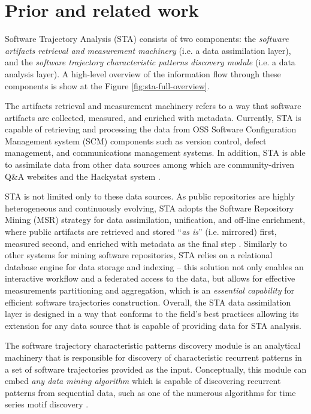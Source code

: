 \chapter{Prior and related work}\label{chapter_background_work}
Software Trajectory Analysis (STA) consists of two components: 
the \textit{software artifacts retrieval and measurement machinery} (i.e. a data assimilation layer), 
and the \textit{software trajectory characteristic patterns discovery module} (i.e. a data analysis layer). 
A high-level overview of the information flow through these components is show at the Figure \ref{fig:sta-full-overview}.

The artifacts retrieval and measurement machinery refers to a way that software artifacts are collected, 
measured, and enriched with metadata. 
Currently, STA is capable of retrieving and processing the data from OSS Software 
Configuration Management system (SCM) components such as version control, 
defect management, and communications management systems. 
In addition, STA is able to assimilate data from other data sources among which are community-driven 
Q\&A websites and the Hackystat system \cite{csdl2-10-09}.

STA is not limited only to these data sources.
As public repositories are highly heterogeneous and continuously evolving, STA adopts the 
Software Repository Mining (MSR) strategy for data assimilation, unification, and off-line enrichment,
where public artifacts are retrieved and stored ``\textit{as is}'' (i.e. mirrored) first, 
measured second, and enriched with metadata as the final step 
\cite{citeulike:12550438} \cite{german04_softchange} \cite{cvsanaly}.
Similarly to other systems for mining software repositories, STA relies on a relational database engine 
for data storage and indexing -- this solution not only enables an interactive workflow and a federated 
access to the data, but allows for effective measurements partitioning and aggregation, which is 
an \textit{essential capability} for efficient software trajectories construction.
Overall, the STA data assimilation layer is designed in a way that conforms to the field's best practices
allowing its extension for any data source that is capable of providing data for STA analysis.

The software trajectory characteristic patterns discovery module is an analytical machinery that 
is responsible for discovery of characteristic recurrent patterns in a set of software trajectories provided as 
the input. Conceptually, this module can embed \textit{any data mining algorithm} which is capable of 
discovering recurrent patterns from sequential data, such as one of the numerous algorithms for time series 
motif discovery \cite{citeulike:13197378}.

